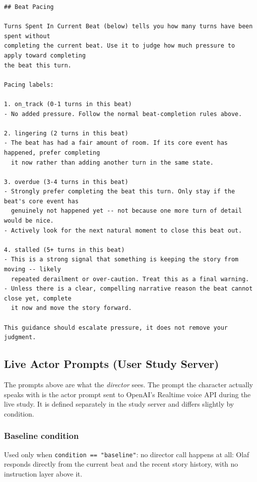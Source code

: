 \begin{lstlisting}
## Beat Pacing

Turns Spent In Current Beat (below) tells you how many turns have been spent without
completing the current beat. Use it to judge how much pressure to apply toward completing
the beat this turn.

Pacing labels:

1. on_track (0-1 turns in this beat)
- No added pressure. Follow the normal beat-completion rules above.

2. lingering (2 turns in this beat)
- The beat has had a fair amount of room. If its core event has happened, prefer completing
  it now rather than adding another turn in the same state.

3. overdue (3-4 turns in this beat)
- Strongly prefer completing the beat this turn. Only stay if the beat's core event has
  genuinely not happened yet -- not because one more turn of detail would be nice.
- Actively look for the next natural moment to close this beat out.

4. stalled (5+ turns in this beat)
- This is a strong signal that something is keeping the story from moving -- likely
  repeated derailment or over-caution. Treat this as a final warning.
- Unless there is a clear, compelling narrative reason the beat cannot close yet, complete
  it now and move the story forward.

This guidance should escalate pressure, it does not remove your judgment.
\end{lstlisting}

\subsection{Live Actor Prompts (User Study Server)}
\label{app:live-actor-prompts}

The prompts above are what the \emph{director} sees. The prompt the character
actually speaks with is the actor prompt sent to OpenAI's Realtime voice API
during the live study. It is defined separately in the study server and
differs slightly by condition.

\subsubsection{Baseline condition}

Used only when \texttt{condition == "baseline"}: no director call happens at
all: Olaf responds directly from the current beat and the recent story
history, with no instruction layer above it.

